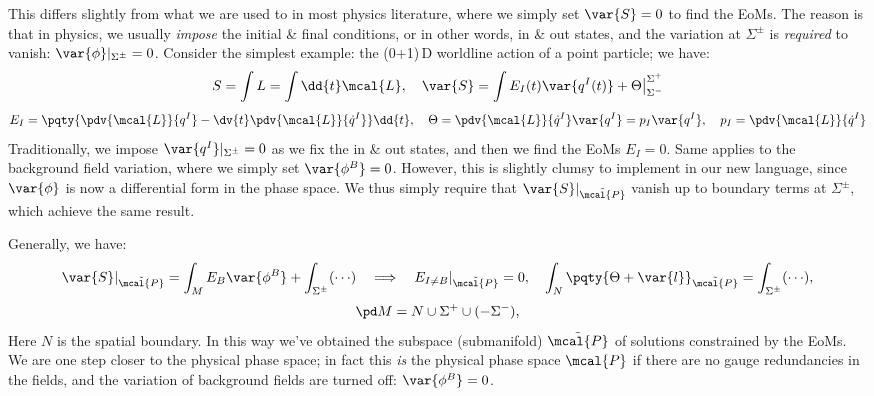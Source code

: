 \documentclass[a4paper
	,10pt
]{article}
\begin{document}
	This differs slightly from what we are used to in most physics literature, where we simply set $\var{S} = 0$ to find the EoMs. The reason is that in physics, we usually \textit{impose} the initial \& final conditions, or in other words, in \& out states, and the variation at $\Sigma^\pm$ is \textit{required} to vanish: $\var{\phi}|_{\Sigma^\pm} = 0$. 
	Consider the simplest example: the (0+1)\,D worldline action of a point particle; we have:
	\begin{equation}
		S = \int L = \int \dd{t} \mcal{L},
	\quad
		\var{S}
		= \int E_I(t) \var{q^I(t)}
			+ \Theta\big|^{\Sigma^+}_{\Sigma^-}
	\end{equation}
	\vspace{-.5\baselineskip}
	\begin{equation}
		E_I = \pqty{
			\pdv{\mcal{L}}{q^I}
			- \dv{t} \pdv{\mcal{L}}{\dot{q}^I}
		} \dd{t},
	\quad
		\Theta
		= \pdv{\mcal{L}}{\dot{q}^I} \var{q^I}
		= p_I \var{q^I},
	\quad
		p_I = \pdv{\mcal{L}}{\dot{q}^I}
	\end{equation}
	Traditionally, we impose $\var{q^I}|_{\Sigma^\pm} = 0$ as we fix the in \& out states, and then we find the EoMs $E_I = 0$. 
	Same applies to the background field variation, where we simply set $\var{\phi^B} = 0$. 
	However, this is slightly clumsy to implement in our new language, since $\var{\phi}$ is now a differential form in the phase space. We thus simply require that $\var{S}|_{\tilde{\mcal{P}}}$ vanish up to boundary terms at $\Sigma^\pm$, which achieve the same result. 
	
	Generally, we have:
	\begin{equation}
		\var{S}|_{\tilde{\mcal{P}}}
		= \int_M E_B \var{\phi^B}
			+ \int_{\Sigma^\pm} ({\cdots})
	\quad\Longrightarrow\quad
		E_{I\ne B}|_{\tilde{\mcal{P}}} = 0,
	\quad
		\int_N \pqty{\Theta + \var{l}}_{\tilde{\mcal{P}}}
		= \int_{\Sigma^\pm} ({\cdots}),
	\end{equation}
	\vspace{-.8\baselineskip}
	\begin{equation}
		\pd M = N \cup \Sigma^+ \cup (-\Sigma^-),
	\end{equation}
	Here $N$ is the spatial boundary. 
	In this way we've obtained the subspace (submanifold) $\tilde{\mcal{P}}$ of \mbox{solutions} constrained by the EoMs. We are one step closer to the physical phase space; in fact this \textit{is} the physical phase space $\mcal{P}$ if there are no gauge redundancies in the fields, and the variation of background fields are turned off: $\var{\phi^B} = 0$. 
	
\end{document}
